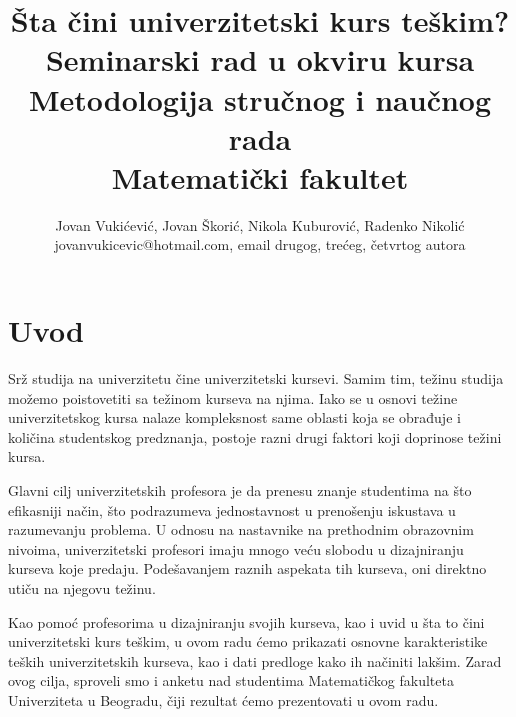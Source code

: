 \documentclass[a4paper]{article}
\begin{document}
\title{Šta čini univerzitetski kurs teškim?\\ \small{Seminarski rad u okviru kursa\\Metodologija stručnog i naučnog rada\\ Matematički fakultet}}

\author{Jovan Vukićević, Jovan Škorić, Nikola Kuburović, Radenko Nikolić\\ jovanvukicevic@hotmail.com, email drugog, trećeg, četvrtog autora}


\maketitle


\tableofcontents

\newpage

\section{Uvod}
\label{sec:uvod}

Srž studija na univerzitetu čine univerzitetski kursevi. Samim tim, težinu studija možemo poistovetiti sa težinom kurseva na njima. Iako se u osnovi težine univerzitetskog kursa nalaze kompleksnost same oblasti koja se obrađuje i količina studentskog predznanja, postoje razni drugi faktori koji doprinose težini kursa.

Glavni cilj univerzitetskih profesora je da prenesu znanje studentima na što efikasniji način, što podrazumeva jednostavnost u prenošenju iskustava u razumevanju problema. U odnosu na nastavnike na prethodnim obrazovnim nivoima, univerzitetski profesori imaju mnogo veću slobodu u dizajniranju kurseva koje predaju. Podešavanjem raznih aspekata tih kurseva, oni direktno utiču na njegovu težinu.

Kao pomoć profesorima u dizajniranju svojih kurseva, kao i uvid u šta to čini univerzitetski kurs teškim, u ovom radu ćemo prikazati osnovne karakteristike teških univerzitetskih kurseva, kao i dati predloge kako ih načiniti lakšim. Zarad ovog cilja, sproveli smo i anketu nad studentima Matematičkog fakulteta Univerziteta u Beogradu, čiji rezultat ćemo prezentovati u ovom radu.
\end{document}

